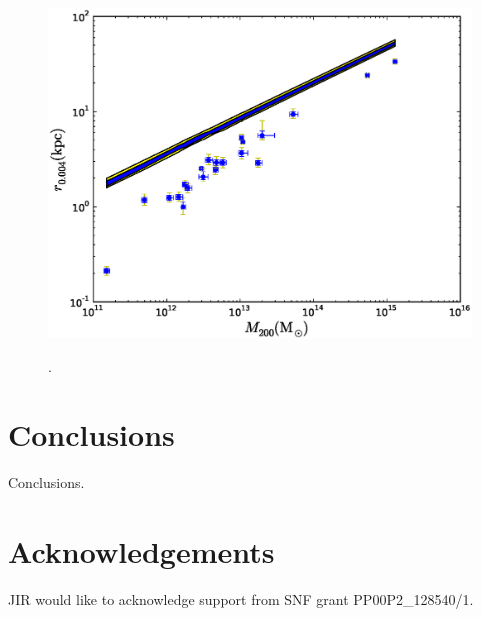 \documentclass[useAMS,usenatbib]{mn2e}
\begin{document}
\begin{figure}
\begin{center}
\hspace{-0mm}\includegraphics[height=0.30\textwidth]{Figures/r004.eps}\\
\caption{.}
\label{alpha}
\end{center}
\end{figure}

\section{Conclusions}\label{sec:conclusions}
Conclusions. 

\section{Acknowledgements}
JIR would like to acknowledge support from SNF grant PP00P2\_128540/1.




\end{document}
